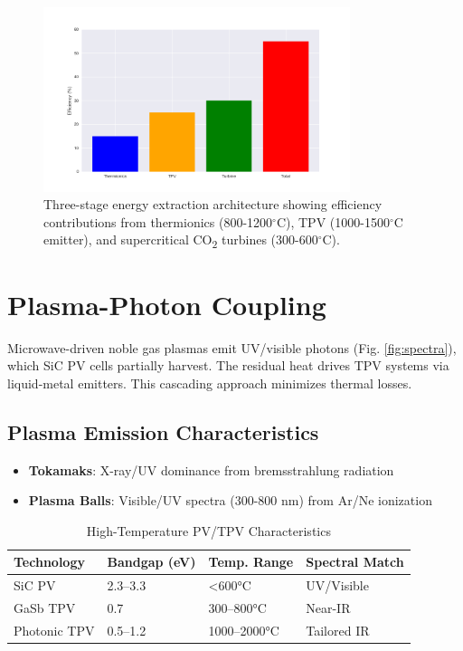 \documentclass{article}
\begin{document}
\begin{figure}[ht]
  \centering
  \includegraphics[width=0.8\textwidth]{hybrid.png}
  \caption{Three-stage energy extraction architecture showing efficiency contributions from thermionics (800-1200$^\circ$C), TPV (1000-1500$^\circ$C emitter), and supercritical CO\textsubscript{2} turbines (300-600$^\circ$C).}
  \label{fig:hybrid}
\end{figure}

\section{Plasma-Photon Coupling}
\label{sec:coupling}
Microwave-driven noble gas plasmas emit UV/visible photons (Fig. \ref{fig:spectra}), which SiC PV cells partially harvest. The residual heat drives TPV systems via liquid-metal emitters. This cascading approach minimizes thermal losses.

\subsection{Plasma Emission Characteristics}
\begin{itemize}
    \item \textbf{Tokamaks}: X-ray/UV dominance from bremsstrahlung radiation
    \item \textbf{Plasma Balls}: Visible/UV spectra (300-800 nm) from Ar/Ne ionization
\end{itemize}

\begin{table}[ht]
    \centering
    \caption{High-Temperature PV/TPV Characteristics}
    \label{tab:pv_tpv}
    \begin{tabular}{llll}
        \toprule
        \textbf{Technology} & \textbf{Bandgap (eV)} & \textbf{Temp. Range} & \textbf{Spectral Match} \\
        \midrule
        SiC PV & 2.3–3.3 & <600°C & UV/Visible \\
        GaSb TPV & 0.7 & 300–800°C & Near-IR \\
        Photonic TPV & 0.5–1.2 & 1000–2000°C & Tailored IR \\
        \bottomrule
    \end{tabular}
\end{table}
\end{document}
